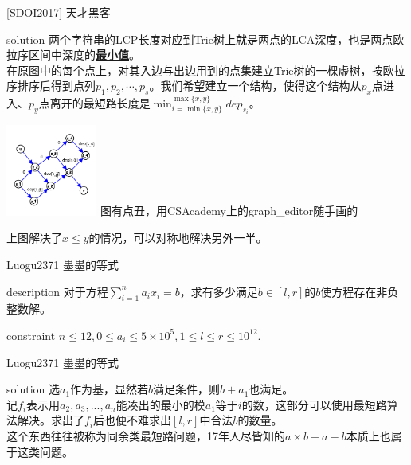\documentclass{beamer}
\def\obj#1{\textbf{\uline{#1}}}
\def\le{\leqslant}
\begin{document}
\begin{frame}{[SDOI2017] 天才黑客}
	\begin{block}{solution}
		两个字符串的LCP长度对应到Trie树上就是两点的LCA深度，也是两点欧拉序区间中深度的\obj{最小值}。\\
		
		在原图中的每个点上，对其入边与出边用到的点集建立Trie树的一棵虚树，按欧拉序排序后得到点列$p_1, p_2, \cdots, p_s$。我们希望建立一个结构，使得这个结构从$p_x$点进入、$p_y$点离开的最短路长度是$\min_{i=\min\{x, y\}}^{\max\{x, y\}}dep_{s_i}$。
		
		\begin{center}
			\includegraphics[width=3.0cm]{hacker.png}
			{\tiny \color{gray} 图有点丑，用CSAcademy上的graph\_editor随手画的}
		\end{center}
		
		上图解决了$x \le y$的情况，可以对称地解决另外一半。
		
	\end{block}
\end{frame}


\begin{frame}{Luogu2371 墨墨的等式}
	\begin{block}{description}
		对于方程$\sum_{i=1}^na_ix_i = b$，求有多少满足$b \in [l,r]$的$b$使方程存在非负整数解。
	\end{block}
	\begin{block}{constraint}
		$n \le 12, 0 \le a_i \le 5 \times 10^5, 1 \le l \le r \le 10^{12}.$
	\end{block}
\end{frame}
\begin{frame}{Luogu2371 墨墨的等式}
	\begin{block}{solution}
		选$a_1$作为基，显然若$b$满足条件，则$b+a_1$也满足。\\
		
		记$f_i$表示用$a_2,a_3,...,a_n$能凑出的最小的模$a_1$等于$i$的数，这部分可以使用最短路算法解决。求出了$f_i$后也便不难求出$[l,r]$中合法$b$的数量。\\
		
		这个东西往往被称为同余类最短路问题，17年人尽皆知的$a\times b - a - b$本质上也属于这类问题。
	\end{block}
\end{frame}
\end{document}
